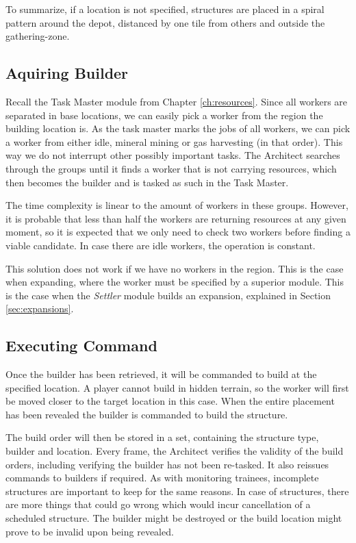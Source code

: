 	To summarize, if a location is not specified, structures are placed in a spiral pattern around the depot, distanced by one tile from others and outside the gathering-zone.

	\subsection*{Aquiring Builder}
	Recall the Task Master module from Chapter \ref{ch:resources}. Since all workers are separated in base locations, we can easily pick a worker from the region the building location is. As the task master marks the jobs of all workers, we can pick a worker from either idle, mineral mining or gas harvesting (in that order). This way we do not interrupt other possibly important tasks. The Architect searches through the groups until it finds a worker that is not carrying resources, which then becomes the builder and is tasked as such in the Task Master.
	
	The time complexity is linear to the amount of workers in these groups. However, it is probable that less than half the workers are returning resources at any given moment, so it is expected that we only need to check two workers before finding a viable candidate. In case there are idle workers, the operation is constant.
	
	This solution does not work if we have no workers in the region. This is the case when expanding, where the worker must be specified by a superior module. This is the case when the \emph{Settler} module builds an expansion, explained in Section \ref{sec:expansions}.
	
	\subsection*{Executing Command}
	Once the builder has been retrieved, it will be commanded to build at the specified location. A player cannot build in hidden terrain, so the worker will first be moved closer to the target location in this case. When the entire placement has been revealed the builder is commanded to build the structure.
	
	The build order will then be stored in a set, containing the structure type, builder and location. Every frame, the Architect verifies the validity of the build orders, including verifying the builder has not been re-tasked. It also reissues commands to builders if required. As with monitoring trainees, incomplete structures are important to keep for the same reasons. In case of structures, there are more things that could go wrong which would incur cancellation of a scheduled structure. The builder might be destroyed or the build location might prove to be invalid upon being revealed.
	
